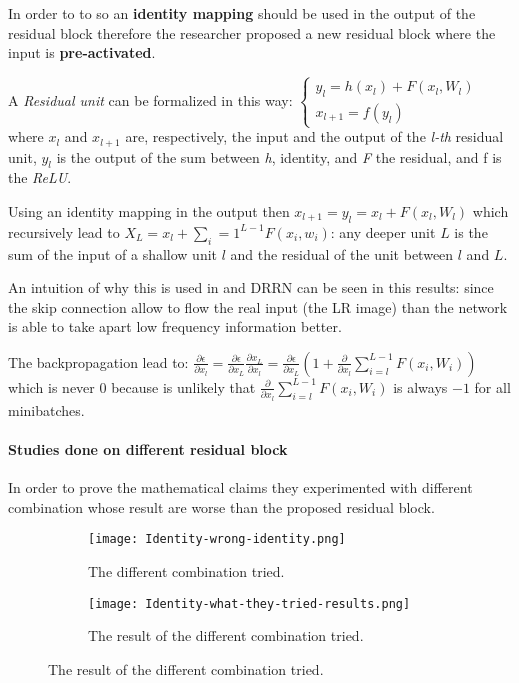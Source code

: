 In order to to so an \textbf{identity mapping} should be used in the output of the residual block therefore the researcher proposed a new residual block where the input is \textbf{pre-activated}.

A \textit{Residual unit} can be formalized in this way:
$
\begin{cases}
    y_l = h(x_l) + F(x_l,W_l) \\
    x_{l+1} = f(y_l)
\end{cases}
$ where $x_l$ and $x_{l+1}$ are, respectively, the input and the output of the \textit{l-th} residual unit, $y_l$ is the output of the sum between \textit{h}, identity, and \textit{F} the residual, and f is the \textit{ReLU}.

Using an identity mapping in the output then $x_{l+1} = y_l = x_l + F(x_l,W_l)$ which recursively lead to $X_L = x_l + \sum_i=1^{L-1} F(x_i,w_i)$: any deeper unit $L$ is the sum of the input of a shallow unit $l$ and the residual of the unit between $l$ and $L$.

An intuition of why this is used in  and DRRN\cite{DRRN} can be seen in this results: since the skip connection allow to flow the real input (the LR image) than the network is able to take apart low frequency information better.

The backpropagation lead to:
$\frac{\partial\epsilon}{\partial x_l} = \frac{\partial\epsilon}{\partial x_L} \frac{\partial x_L}{\partial x_l} = \frac{\partial\epsilon}{\partial x_L} \left(1 + \frac{\partial}{\partial x_l} \sum_{i=l}^{L-1} F(x_i,W_i)\right)$
which is never 0 because is unlikely that $ \frac{\partial}{\partial x_l} \sum_{i=l}^{L-1} F(x_i,W_i)$ is always $-1$ for all minibatches.

\paragraph{Studies done on different residual block}
In order to prove the mathematical claims they experimented with different combination whose result are worse than the proposed residual block.

\begin{figure}[H]
    \begin{subfigure}{\textwidth}
        \centering
        \texttt{[image: Identity-wrong-identity.png]}    
        \caption{The different combination tried.}
    \end{subfigure}
    \begin{subfigure}{\textwidth}
        \centering
        \texttt{[image: Identity-what-they-tried-results.png]}    
        \caption{The result of the different combination tried.}        
    \end{subfigure}
\end{figure}

